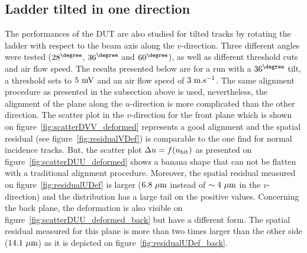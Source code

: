     \subsection{Ladder tilted in one direction}
    \label{subsec:deformation}

      The performances of the \gls{DUT} are also studied for tilted tracks by rotating the ladder with respect to the beam axis along the $v$-direction.
      Three different angles were tested ($28^{\degree}$, $36^{\degree}$ and $60^{\degree}$), as well as different threshold cuts and air flow speed. 
      The results presented below are for a run with a $36^{\degree}$ tilt, a threshold sets to $5~\rm{mV}$ and an air flow speed of $3~\rm{m.s}^{-1}$.
      The same alignment procedure as presented in the subsection above is used, nevertheless, the alignment of the plane along the $u$-direction is more complicated than the other direction.
      The scatter plot in the $v$-direction for the front plane which is shown on figure~\ref{fig:scatterDVV_deformed} represents a good alignment and the spatial residual (see figure~\ref{fig:residualVDef}) is comparable to the one find for normal incidence tracks.
      But, the scatter plot $\Delta u = f(u_{\rm{hit}})$ as presented on figure~\ref{fig:scatterDUU_deformed} shows a banana shape that can not be flatten with a traditional alignment procedure.
      Moreover, the spatial residual measured on figure~\ref{fig:residualUDef} is larger ($6.8~\rm{\mu m}$ instead of $\sim 4~\rm{\mu m}$ in the $v$-direction) and the distribution has a large tail on the positive values.
      Concerning the back plane, the deformation is also visible on figure~\ref{fig:scatterDUU_deformed_back} but have a different form.
      The spatial residual measured for this plane is more than two times larger than the other side ($14.1~\rm{\mu m}$) as it is depicted on figure~\ref{fig:residualUDef_back}.

